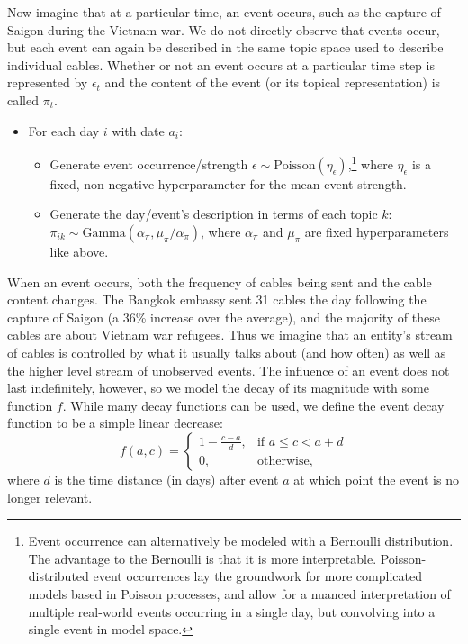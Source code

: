 Now imagine that at a particular time, an event occurs, such as the capture of Saigon during the Vietnam war.  We do not directly observe that events occur, but each event can again be described in the same topic space used to describe individual cables.  Whether or not an event occurs at a particular time step is represented by $\epsilon_t$ and the content of the event (or its topical representation) is called $\pi_t$.

\begin{itemize}
\item For each day $i$ with date $a_i$:
\begin{itemize}
\item Generate event occurrence/strength $\epsilon \sim \mbox{Poisson}
(\eta_\epsilon)$,\footnote{Event occurrence can alternatively be modeled with a Bernoulli distribution.  The advantage to the Bernoulli is that it is more interpretable.  Poisson-distributed event occurrences lay the groundwork for more complicated models based in Poisson processes, and allow for a nuanced interpretation of multiple real-world events occurring in a single day, but convolving into a single event in model space.} where $\eta_\epsilon$ is a fixed, non-negative
hyperparameter for the mean event strength.
\item Generate the day/event's description in terms of each topic $k$: $\pi_{ik} \sim \mbox{Gamma}(\alpha_\pi, \mu_\pi/\alpha_\pi)$, where $\alpha_\pi$ and $\mu_\pi$ are fixed hyperparameters like above.
\end{itemize}
\end{itemize}

When an event occurs, both the frequency of cables being sent and the cable content changes. The Bangkok embassy sent 31 cables the day following the capture of Saigon (a 36\% increase over the average), and the majority of these cables are about Vietnam war refugees.  Thus we imagine that an entity's stream of cables is controlled by what it usually talks about (and how often) as well as the higher level stream of unobserved events.  The influence of an event does not last indefinitely, however, so we model the decay of its magnitude with some function $f$.
While many decay functions can be used, we define the event decay function to be a simple linear decrease: \[f(a, c) =
\begin{cases}
	1 - \frac{c-a}{d}, & \mbox{if } a \le c < a+d \\
	0, & \mbox{otherwise,}
\end{cases} \]
where $d$ is the time distance (in days) after event $a$ at which point the event is no longer relevant.

